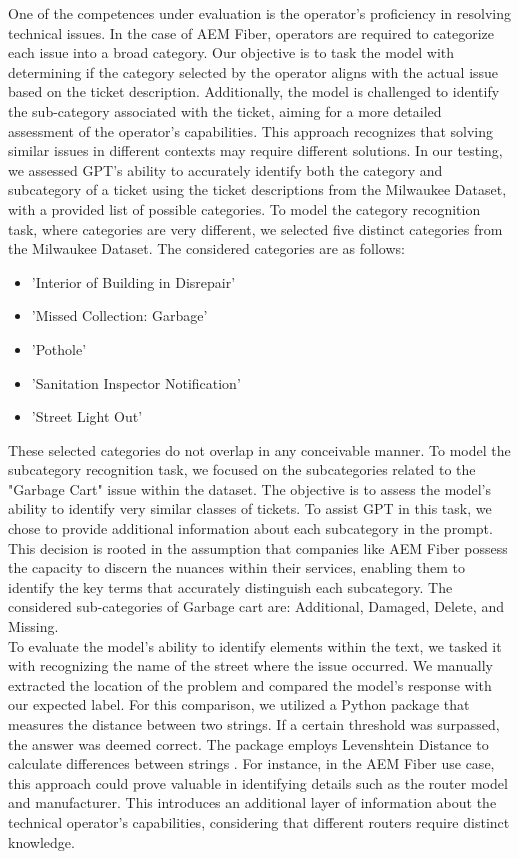 One of the competences under evaluation is the operator's proficiency in resolving technical issues. In the case of AEM Fiber, operators are required to categorize each issue into a broad category. Our objective is to task the model with determining if the category selected by the operator aligns with the actual issue based on the ticket description. Additionally, the model is challenged to identify the sub-category associated with the ticket, aiming for a more detailed assessment of the operator's capabilities. This approach recognizes that solving similar issues in different contexts may require different solutions. In our testing, we assessed GPT's ability to accurately identify both the category and subcategory of a ticket using the ticket descriptions from the Milwaukee Dataset, with a provided list of possible categories. To model the category recognition task, where categories are very different, we selected five distinct categories from the Milwaukee Dataset. The considered categories are as follows:
\begin{itemize}
      \item 'Interior of Building in Disrepair'
      \item 'Missed Collection: Garbage'
      \item 'Pothole'
      \item 'Sanitation Inspector Notification'
      \item 'Street Light Out'
\end{itemize}
These selected categories do not overlap in any conceivable manner. To model the subcategory recognition task, we focused on the subcategories related to the "Garbage Cart" issue within the dataset. The objective is to assess the model's ability to identify very similar classes of tickets. To assist GPT in this task, we chose to provide additional information about each subcategory in the prompt. This decision is rooted in the assumption that companies like AEM Fiber possess the capacity to discern the nuances within their services, enabling them to identify the key terms that accurately distinguish each subcategory. The considered sub-categories of Garbage cart are: Additional, Damaged, Delete, and Missing.\\

To evaluate the model's ability to identify elements within the text, we tasked it with recognizing the name of the street where the issue occurred. We manually extracted the location of the problem and compared the model's response with our expected label. For this comparison, we utilized a Python package that measures the distance between two strings. If a certain threshold was surpassed, the answer was deemed correct. The package employs Levenshtein Distance to calculate differences between strings \cite{fuzzywuzzy}. For instance, in the AEM Fiber use case, this approach could prove valuable in identifying details such as the router model and manufacturer. This introduces an additional layer of information about the technical operator's capabilities, considering that different routers require distinct knowledge.

